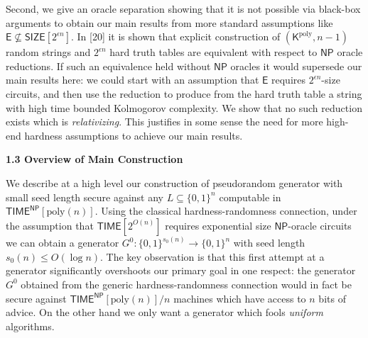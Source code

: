 \documentclass[10pt,a4paper]{article}
\begin{document}
Second, we give an oracle separation showing that it is not possible via black-box arguments to obtain our main results from more standard assumptions like ${\mathsf{E}}\not\subseteq{\mathsf{SIZE}}[2^{\epsilon n}]$. In [20] it is shown that explicit construction of $({\mathsf{K}}^{\mathrm{poly}},n-1)$ random strings and $2^{\epsilon n}$ hard truth tables are equivalent with respect to ${\mathsf{NP}}$ oracle reductions. If such an equivalence held without ${\mathsf{NP}}$ oracles it would supersede our main results here: we could start with an assumption that ${\mathsf{E}}$ requires $2^{\epsilon n}$-size circuits, and then use the reduction to produce from the hard truth table a string with high time bounded Kolmogorov complexity. We show that no such reduction exists which is \emph{relativizing}. This justifies in some sense the need for more high-end hardness assumptions to achieve our main results.\par






\par\medskip\noindent\textbf{
1.3 Overview of Main Construction}\par




We describe at a high level our construction of pseudorandom generator with small seed length secure against any $L\subseteq\{0,1\}^{n}$ computable in ${\mathsf{TIME}}^{\mathsf{NP}}[\mathrm{poly}(n)]$. Using the classical hardness-randomness connection, under the assumption that ${\mathsf{TIME}}[2^{O(n)}]$ requires exponential size ${\mathsf{NP}}$-oracle circuits we can obtain a generator $G^{0}:\{0,1\}^{s_{0}(n)}\to\{0,1\}^{n}$ with seed length $s_{0}(n)\leq O(\log n)$. The key observation is that this first attempt at a generator significantly overshoots our primary goal in one respect: the generator $G^{0}$ obtained from the generic hardness-randomness connection would in fact be secure against ${\mathsf{TIME}}^{\mathsf{NP}}[\mathrm{poly}(n)]/n$ machines which have access to $n$ bits of advice. On the other hand we only want a generator which fools \emph{uniform} algorithms.\par
\end{document}
